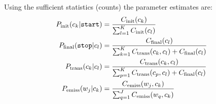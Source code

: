 Using the sufficient statistics (counts) the parameter estimates are: 
\begin{align}
  P_{\mathrm{init}}(c_k | \text{\tt start}) &=  \frac{C_{\mathrm{init}}(c_k)}{\sum_{l=1}^K
    C_{\mathrm{init}}(c_l)}\\
  P_{\mathrm{final}}(\text{\tt stop} | c_l) &=  \frac{C_{\mathrm{final}}(c_l)}{\sum_{k=1}^K
    C_{\mathrm{trans}}(c_k,c_l) + C_{\mathrm{final}}(c_l)}\\
  P_{\mathrm{trans}}(c_k | c_l) &=  \frac{C_{\mathrm{trans}}(c_k,c_l)}{\sum_{p=1}^K
    C_{\mathrm{trans}}(c_p,c_l) + C_{\mathrm{final}}(c_l)}\\
  P_{\mathrm{emiss}}(w_j | c_k) &=  \frac{C_{\mathrm{emiss}}(w_j,c_k)}{\sum_{q=1}^J
    C_{\mathrm{emiss}}(w_q,c_k)}
\end{align}


%
%
%
%
%



